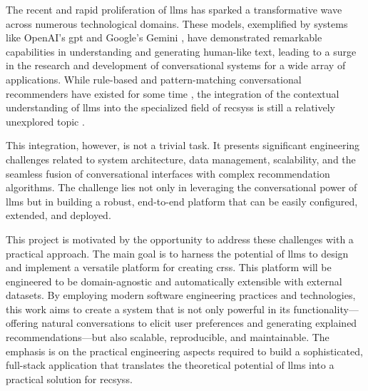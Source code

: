 The recent and rapid proliferation of \acp{llm} has sparked a transformative wave across numerous technological domains. These models, exemplified by systems like OpenAI's \ac{gpt} \cite{CHATGPT} and Google's Gemini \cite{GEMINI}, have demonstrated remarkable capabilities in understanding and generating human-like text, leading to a surge in the research and development of conversational systems for a wide array of applications. While rule-based and pattern-matching conversational recommenders have existed for some time \cite{SOTA-CRS}, the integration of the contextual understanding of \acp{llm} into the specialized field of \acl{recsys}s is still a relatively unexplored topic \cite{SOTA-CRS-LLM}.

This integration, however, is not a trivial task. It presents significant engineering challenges related to system architecture, data management, scalability, and the seamless fusion of conversational interfaces with complex recommendation algorithms. The challenge lies not only in leveraging the conversational power of \acp{llm} but in building a robust, end-to-end platform that can be easily configured, extended, and deployed.

This project is motivated by the opportunity to address these challenges with a practical approach. The main goal is to harness the potential of \acp{llm} to design and implement a versatile platform for creating \acp{crs}. This platform will be engineered to be domain-agnostic and automatically extensible with external datasets. By employing modern software engineering practices and technologies, this work aims to create a system that is not only powerful in its functionality---offering natural conversations to elicit user preferences \cite[Conversational Preference Elicitation]{CHAPTER:RS-HANDBOOK-NLP} and generating explained recommendations---but also scalable, reproducible, and maintainable. The emphasis is on the practical engineering aspects required to build a sophisticated, full-stack application that translates the theoretical potential of \acp{llm} into a practical solution for \acl{recsys}s.